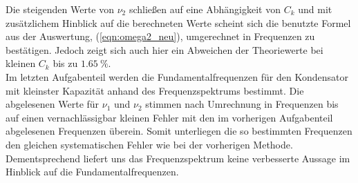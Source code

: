 Die steigenden Werte von $\nu_2$ schließen auf eine Abhängigkeit von $C_k$ und mit zusätzlichem Hinblick auf die berechneten Werte scheint sich die benutzte Formel aus der Auswertung, (\ref{eqn:omega2_neu}), umgerechnet in Frequenzen zu bestätigen.
Jedoch zeigt sich auch hier ein Abweichen der Theoriewerte bei kleinen $C_k$ bis zu $\SI{1.65}{\percent}$.\\
Im letzten Aufgabenteil werden die Fundamentalfrequenzen für den Kondensator mit kleinster Kapazität anhand des Frequenzspektrums bestimmt.
Die abgelesenen Werte für $\nu_1$ und $\nu_2$ stimmen nach Umrechnung in Frequenzen bis auf einen vernachlässigbar kleinen Fehler mit den im vorherigen Aufgabenteil abgelesenen Frequenzen überein.
Somit unterliegen die so bestimmten Frequenzen den gleichen systematischen Fehler wie bei der vorherigen Methode.
Dementsprechend liefert uns das Frequenzspektrum keine verbesserte Aussage im Hinblick auf die Fundamentalfrequenzen.
